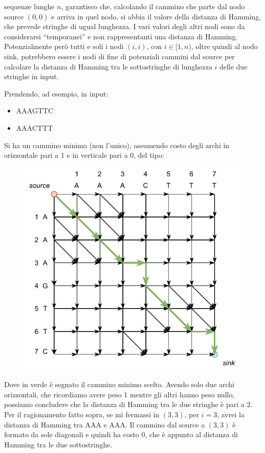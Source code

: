 \documentclass[a4paper,12pt, oneside]{book}
\begin{document}
sequenze lunghe $n$, garantisco che, calcolando il cammino che parte dal nodo
source $(0,0)$ e arriva in quel nodo, si abbia il valore della
distanza di Hamming, che prevede stringhe di ugual lunghezza. I vari valori
degli altri nodi sono da considerarsi ``temporanei'' e non rappresentanti una
distanza di Hamming. Potenzialmente però tutti e soli i nodi $(i,i)$, con
$i\in[1,n)$, oltre quindi al nodo sink, potrebbero essere i nodi di fine di
potenziali cammini dal source per calcolare la distanza di Hamming tra le
sottostringhe di lunghezza $i$ delle due stringhe in input.\\
\begin{esempio}
  Prendendo, ad esempio, in input:
  \begin{itemize}
    \item AAAGTTC
    \item AAACTTT
  \end{itemize}
  Si ha un cammino minimo (non l'unico), assumendo costo degli archi in
  orizzontale pari a 1 e in verticale pari a 0, del tipo:
  \begin{figure}[H]
    \centering
    \includegraphics[scale = 1]{img/es3.pdf}
  \end{figure}
  \noindent
  Dove in verde è segnato il cammino minimo scelto. Avendo solo due archi
  orizzontali, che ricordiamo avere peso 1 mentre gli altri hanno peso nullo,
  possiamo concludere che la distanza di Hamming tra le due stringhe è 
  pari a 2.\\
  Per il ragionamento fatto sopra, se mi fermassi in $(3,3)$, per $i=3$, avrei
  la distanza di Hamming tra AAA e AAA. Il cammino dal source a $(3,3)$ è
  formato da sole diagonali e quindi ha costo 0, che è appunto al distanza di
  Hamming tra le due sottostringhe.
\end{esempio}
\end{document}
